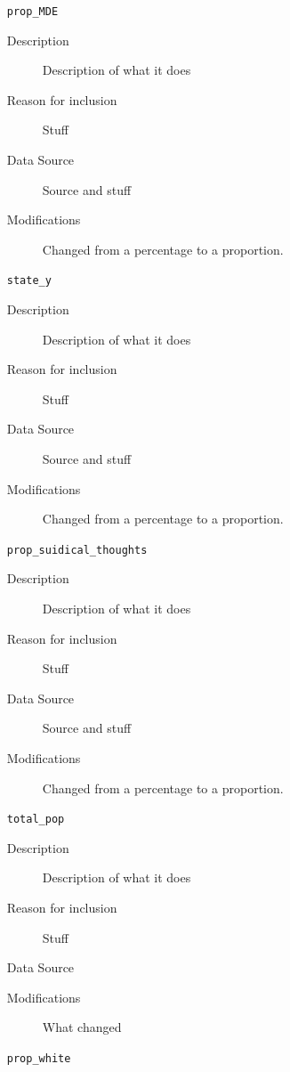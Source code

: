 \documentclass{article}
\begin{document}
\begin{itemize}[label={}, align=left]
\begin{description}
          \end{description}
    \item[\texttt{prop\_MDE}] \
          \begin{description}
              \item[Description] Description of what it does
              \item[Reason for inclusion] Stuff
              \item[Data Source] Source and stuff
              \item[Modifications] Changed from a percentage to a proportion.
          \end{description}
    \item[\texttt{state\_y}] \
          \begin{description}
              \item[Description] Description of what it does
              \item[Reason for inclusion] Stuff
              \item[Data Source] Source and stuff
              \item[Modifications] Changed from a percentage to a proportion.
          \end{description}
    \item[\texttt{prop\_suidical\_thoughts}] \
          \begin{description}
              \item[Description] Description of what it does
              \item[Reason for inclusion] Stuff
              \item[Data Source] Source and stuff
              \item[Modifications] Changed from a percentage to a proportion.
          \end{description}
    \item[\texttt{total\_pop}] \
          \begin{description}
              \item[Description] Description of what it does
              \item[Reason for inclusion] Stuff
              \item[Data Source] \cite{acs_demographics_data}
              \item[Modifications] What changed
          \end{description}
    \item[\texttt{prop\_white}] \
          \begin{description}

\end{description}
\end{itemize}
\end{document}
